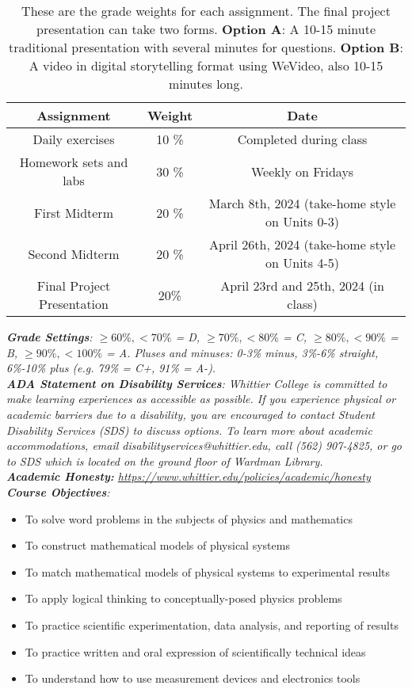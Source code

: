 \documentclass[10pt]{article}
\begin{document}
\begin{table}
\centering
\begin{tabular}{| c | c | c |}
\hline
\textbf{Assignment} & \textbf{Weight} & \textbf{Date} \\ \hline
Daily exercises & 10 \% & Completed during class\\ \hline
Homework sets and labs & 30 \% & Weekly on Fridays \\ \hline
First Midterm & 20 \% & March 8th, 2024 (take-home style on Units 0-3)\\ \hline
Second Midterm & 20 \% & April 26th, 2024 (take-home style on Units 4-5) \\ \hline
Final Project Presentation & 20\% & April 23rd and 25th, 2024 (in class) \\ \hline
\end{tabular}
\caption{\label{tab:grades} These are the grade weights for each assignment. The final project presentation can take two forms.  \textbf{Option A}: A 10-15 minute traditional presentation with several minutes for questions.  \textbf{Option B}: A video in digital storytelling format using WeVideo, also 10-15 minutes long.}
\end{table}
\noindent
\textit{\textbf{Grade Settings}: $\geq 60\%, <70\%$ = D, $\geq 70\%, <80\%$ = C, $\geq 80\%, <90\%$ = B, $\geq 90\%, <100\%$ = A. Pluses and minuses: 0-3\% minus, 3\%-6\% straight, 6\%-10\% plus (e.g. 79\% = C+, 91\% = A-).} \\
\textit{\textbf{ADA Statement on Disability Services}: Whittier College is committed to make learning experiences as accessible as possible. If you experience physical or academic barriers due to a disability, you are encouraged to contact Student Disability Services (SDS) to discuss options. To learn more about academic accommodations, email disabilityservices@whittier.edu, call (562) 907-4825, or go to SDS which is located on the ground floor of Wardman Library.} \\
\textit{\textbf{Academic Honesty:} \url{https://www.whittier.edu/policies/academic/honesty}} \\
\noindent
\textit{\textbf{Course Objectives}:}
\begin{itemize}
\item To solve word problems in the subjects of physics and mathematics
\item To construct mathematical models of physical systems
\item To match mathematical models of physical systems to experimental results
\item To apply logical thinking to conceptually-posed physics problems
\item To practice scientific experimentation, data analysis, and reporting of results
\item To practice written and oral expression of scientifically technical ideas
\item To understand how to use measurement devices and electronics tools
\end{itemize}
\end{document}
